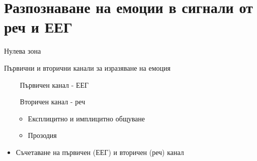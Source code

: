 \documentclass[9pt]{beamer}
\begin{document}
\section{Разпознаване на емоции в сигнали от реч и ЕЕГ}
\begin{frame}{Нулева зона}
    \pause
    \begin{center}
        Първични и вторични канали за изразяване на емоция
    \end{center}
    \pause 
    \begin{itemize}
        \item[$\ $] Първичен канал - ЕЕГ
        \pause
        \item[$\ $] Вторичен канал - реч
        \begin{itemize}
            \pause 
            \item Експлицитно и имплицитно общуване
            \pause
            \item Прозодия
        \end{itemize}
        \pause
        \item Съчетаване на първичен (ЕЕГ) и вторичен (реч) канал
    \end{itemize}
\end{frame}
\end{document}
